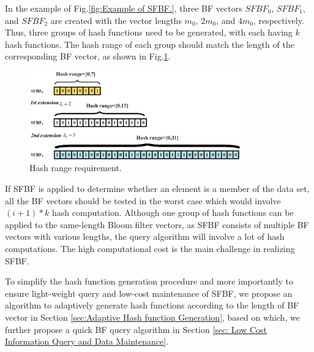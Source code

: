 \documentclass[10pt,journal,letterpaper]{IEEEtran}
\begin{document}
In the example of Fig.\ref{fig:Example of SFBF.}, three BF vectors $SFBF_0$, $SFBF_1$, and $SFBF_2$ are created with the vector lengths $m_0$, $2m_0$, and $4m_0$, respectively. Thus, three groups of hash functions need to be generated, with each having $k$ hash functions. The hash range of each group should match the length of the corresponding BF vector, as shown in Fig.\ref{fig:Hash range requirement.}.

\begin{figure}[!h]
\centering
\includegraphics[width=3.6in]{fig/HashRange}
\caption{Hash range requirement.}
\label{fig:Hash range requirement.}
\end{figure}

If SFBF is applied to determine whether an element  is  a member of the data set, all the BF vectors should be tested in the worst case which would involve $(i+1)*k$ hash computation. Although one group of hash functions can be applied to the same-length Bloom filter vectors, as SFBF consists of multiple BF vectors with various lengths, the query algorithm will involve a lot of hash computations. The high computational cost is the main challenge in realizing SFBF.




To simplify the hash function generation procedure and more importantly to ensure light-weight query and low-cost maintenance of  SFBF, we propose an algorithm to adaptively generate hash functions according to the length of BF vector  in Section \ref{sec:Adaptive Hash function Generation}, based on which, we further propose a quick BF query algorithm in Section \ref{sec: Low Cost Information Query and Data Maintenance}.
\end{document}
